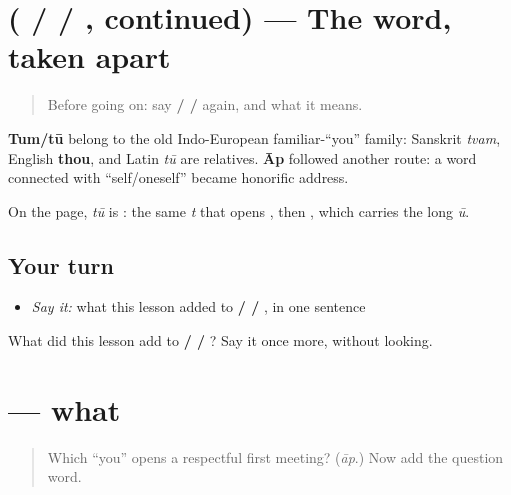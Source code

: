 \section[\texorpdfstring{(\ur{آپ} / \ur{تم} / \ur{تو}, continued)}{(آپ / تم / تو, continued)}]{( /  / , continued) — The word, taken apart}

\label{lesson:UR-C03-aap-tum-tu-more}



\begin{quote}
Before going on: say \textbf{ /  / } again, and what it means.
\end{quote}

\begin{cousinweb}
\textbf{Tum/tū} belong to the old Indo-European familiar-“you” family: Sanskrit \emph{tvam}, English \textbf{thou}, and Latin \emph{tū} are relatives. \textbf{Āp} followed another route: a word connected with “self/oneself” became honorific address.

On the page, \emph{tū} is \textbf{}: the same \textbf{} \emph{t} that opens \textbf{}, then \textbf{}, which carries the long \emph{ū}.
\end{cousinweb}

\subsection*{Your turn}
\begin{itemize}
\raggedright
  \item \emph{Say it:} what this lesson added to \textbf{ /  / }, in one sentence
\end{itemize}

\begin{tcolorbox}[breakable,colback=teal!4,colframe=teal!35!black,title={Before you move on}]
What did this lesson add to \textbf{ /  / }? Say it once more, without looking.
\end{tcolorbox}
\section[\texorpdfstring{\ur{کیا} (kyā)}{کیا (kyā)}]{ — what}

\label{lesson:UR-C03-kya}



\begin{quote}
Which “you” opens a respectful first meeting? (\emph{āp}.) Now add the question word.
\end{quote}

